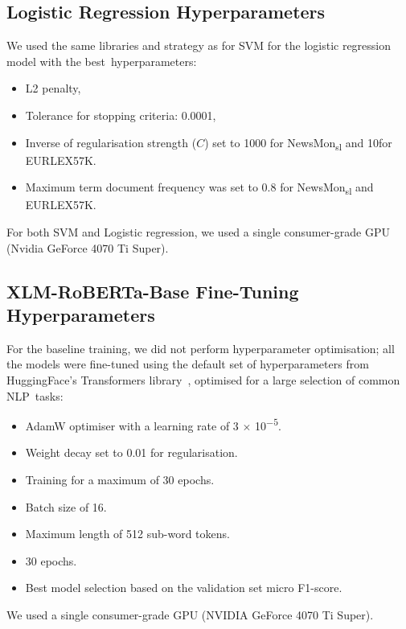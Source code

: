 \documentclass[make,article,accept,pdftex,moreauthors]{Definitions/mdpi}
\begin{document}
\subsection[\appendixname~\thesubsection]{Logistic Regression Hyperparameters}
\label{subsec:hyper_parameters_logreg}
We used the same libraries and strategy as for SVM for the logistic regression model with the best~hyperparameters:
\begin{itemize}\itemsep=0pt
  \item L2 penalty,
  \item Tolerance for stopping criteria: 0.0001,
  \item Inverse of regularisation strength ($C$) set to 1000 for NewsMon\textsubscript{sl} and 10\linebreak for EURLEX57K.
  \item Maximum term document frequency was set to 0.8 for NewsMon\textsubscript{sl} and EURLEX57K.
\end{itemize}

For both SVM and Logistic regression, we used a single consumer-grade GPU (Nvidia GeForce 4070 Ti Super).

\subsection[\appendixname~\thesubsection]{XLM-RoBERTa-Base Fine-Tuning Hyperparameters}
\label{subsec:hyper_parameters_xlmr}
For the baseline training, we did not perform hyperparameter optimisation; all the models were fine-tuned using the default set of hyperparameters from HuggingFace's Transformers library~\citep{wolf-etal-2020-transformers}, optimised for a large selection of common NLP~tasks:
\begin{itemize}\itemsep=0pt
  \item AdamW optimiser with a learning rate of 3 $\times$ 10\textsuperscript{$-5$}.
  \item Weight decay set to 0.01 for regularisation.
  \item Training for a maximum of 30 epochs.
  \item Batch size of 16.
  \item Maximum length of 512 sub-word tokens.
  \item 30 epochs.
  \item Best model selection based on the validation set micro F1-score.
\end{itemize}

We used a single consumer-grade GPU (NVIDIA GeForce 4070 Ti Super).
\end{document}
